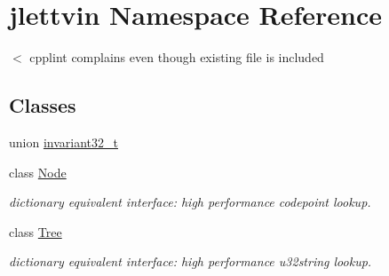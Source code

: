 \hypertarget{namespacejlettvin}{}\section{jlettvin Namespace Reference}
\label{namespacejlettvin}


$<$ cpplint complains even though existing file is included  


\subsection*{Classes}
\begin{DoxyCompactItemize}
\item 
union \hyperlink{unionjlettvin_1_1invariant32__t}{invariant32\+\_\+t}
\item 
class \hyperlink{classjlettvin_1_1_node}{Node}
\begin{DoxyCompactList}\small\item\em dictionary equivalent interface\+: high performance codepoint lookup. \end{DoxyCompactList}\item 
class \hyperlink{classjlettvin_1_1_tree}{Tree}
\begin{DoxyCompactList}\small\item\em dictionary equivalent interface\+: high performance u32string lookup. \end{DoxyCompactList}\end{DoxyCompactItemize}
